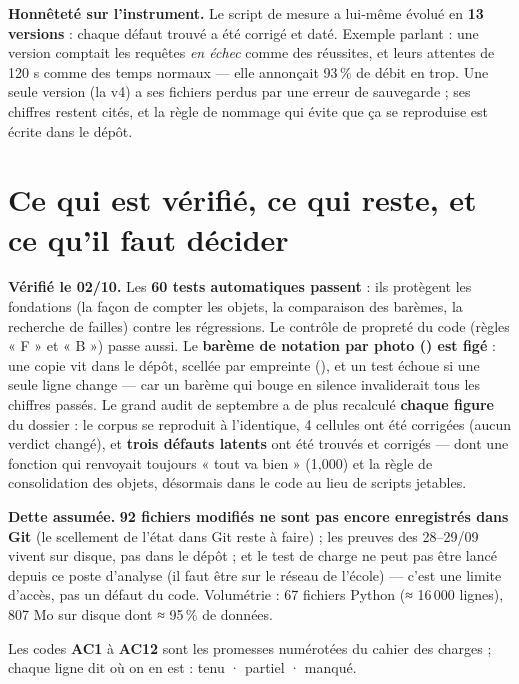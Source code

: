 \documentclass[10pt,a4paper]{article}
\providecommand{\NoAutoSpacing}{}
\newcommand{\code}[1]{{\NoAutoSpacing\ttfamily\detokenize{#1}}}
\newcommand{\OK}{\textcolor{ok}{\faCheckCircle}}
\newcommand{\KO}{\textcolor{fail}{\faTimesCircle}}
\newcommand{\PART}{\textcolor{warn}{\faClock}}
\begin{document}
\noindent\textbf{Honnêteté sur l'instrument.} Le script de mesure a lui-même évolué en
\textbf{13 versions} : chaque défaut trouvé a été corrigé et daté. Exemple parlant : une version
comptait les requêtes \emph{en échec} comme des réussites, et leurs attentes de 120 s comme des
temps normaux — elle annonçait 93\,\% de débit en trop. Une seule version (la v4) a ses fichiers
perdus par une erreur de sauvegarde ; ses chiffres restent cités, et la règle de nommage qui évite
que ça se reproduise est écrite dans le dépôt.

\section{Ce qui est vérifié, ce qui reste, et ce qu'il faut décider}
\noindent\textbf{Vérifié le 02/10.} Les \textbf{60 tests automatiques passent} : ils protègent les
fondations (la façon de compter les objets, la comparaison des barèmes, la recherche de failles)
contre les régressions. Le contrôle de propreté du code (règles « F » et « B ») passe aussi. Le
\textbf{barème de notation par photo (\code{audit-grading}) est figé} : une copie vit dans le
dépôt, scellée par empreinte (\code{30ca55a0…}), et un test échoue si une seule ligne change —
car un barème qui bouge en silence invaliderait tous les chiffres passés. Le grand audit de
septembre a de plus recalculé \textbf{chaque figure} du dossier : le corpus se reproduit à l'identique, 4 cellules ont été
corrigées (aucun verdict changé), et \textbf{trois défauts latents} ont été trouvés et corrigés —
dont une fonction qui renvoyait toujours « tout va bien » (1,000) et la règle de consolidation des
objets, désormais dans le code au lieu de scripts jetables.

\noindent\textbf{Dette assumée.} \textbf{92 fichiers modifiés ne sont pas encore enregistrés dans Git} (le
scellement de l'état dans Git reste à faire) ; les preuves des 28–29/09 vivent sur disque, pas dans
le dépôt ; et le test de charge ne peut pas être lancé depuis ce poste d'analyse (il faut être sur
le réseau de l'école) — c'est une limite d'accès, pas un défaut du code. Volumétrie : 67 fichiers
Python (≈ 16\,000 lignes), 807 Mo sur disque dont ≈ 95\,\% de données.

\noindent Les codes \textbf{AC1} à \textbf{AC12} sont les promesses numérotées du cahier des
charges ; chaque ligne dit où on en est : \OK{} tenu · \PART{} partiel · \KO{} manqué.
\end{document}
